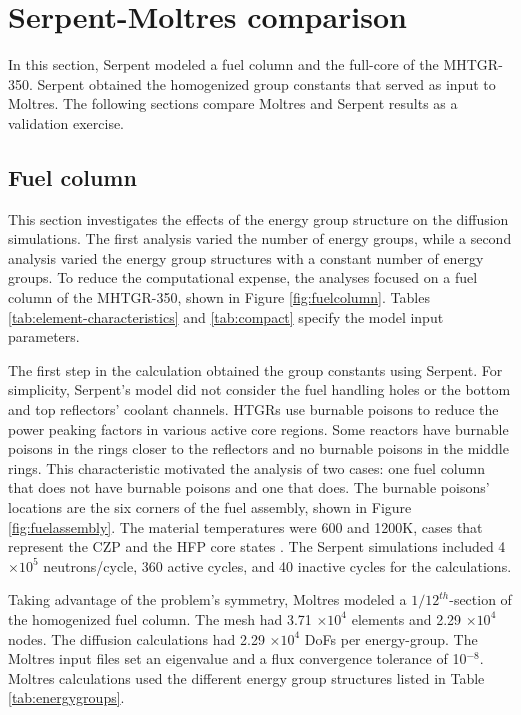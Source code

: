 \section{Serpent-Moltres comparison}
\label{sec:neut-serpent}

In this section, Serpent modeled a fuel column and the full-core of the MHTGR-350.
Serpent obtained the homogenized group constants that served as input to Moltres.
The following sections compare Moltres and Serpent results as a validation exercise.

\subsection{Fuel column}
\label{sec:neut-fuelcol}

This section investigates the effects of the energy group structure on the diffusion simulations.
The first analysis varied the number of energy groups, while a second analysis varied the energy group structures with a constant number of energy groups.
To reduce the computational expense, the analyses focused on a fuel column of the MHTGR-350, shown in Figure \ref{fig:fuelcolumn}.
Tables \ref{tab:element-characteristics} and \ref{tab:compact} specify the model input parameters.

The first step in the calculation obtained the group constants using Serpent.
For simplicity, Serpent's model did not consider the fuel handling holes or the bottom and top reflectors' coolant channels.
HTGRs use burnable poisons to reduce the power peaking factors in various active core regions.
Some reactors have burnable poisons in the rings closer to the reflectors and no burnable poisons in the middle rings.
This characteristic motivated the analysis of two cases: one fuel column that does not have burnable poisons and one that does.
The burnable poisons' locations are the six corners of the fuel assembly, shown in Figure \ref{fig:fuelassembly}.
The material temperatures were 600 and 1200K, cases that represent the \gls{CZP} and the \gls{HFP} core states \cite{strydom_results_2015}.
The Serpent simulations included 4$\times 10^5$ neutrons/cycle, 360 active cycles, and 40 inactive cycles for the calculations.

Taking advantage of the problem's symmetry, Moltres modeled a $1/12^{th}$-section of the homogenized fuel column.
The mesh had 3.71 $\times 10^4$ elements and 2.29 $\times 10^4$ nodes.
The diffusion calculations had 2.29 $\times 10^4$ \glspl{DoF} per energy-group.
The Moltres input files set an eigenvalue and a flux convergence tolerance of 10$^{-8}$.
Moltres calculations used the different energy group structures listed in Table \ref{tab:energygroups}.

